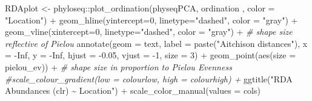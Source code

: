 \documentclass[
]{book}
\newenvironment{Shaded}{\begin{snugshade}}{\end{snugshade}}
\newcommand{\AttributeTok}[1]{\textcolor[rgb]{0.77,0.63,0.00}{#1}}
\newcommand{\CommentTok}[1]{\textcolor[rgb]{0.56,0.35,0.01}{\textit{#1}}}
\newcommand{\ConstantTok}[1]{\textcolor[rgb]{0.00,0.00,0.00}{#1}}
\newcommand{\DecValTok}[1]{\textcolor[rgb]{0.00,0.00,0.81}{#1}}
\newcommand{\FloatTok}[1]{\textcolor[rgb]{0.00,0.00,0.81}{#1}}
\newcommand{\FunctionTok}[1]{\textcolor[rgb]{0.00,0.00,0.00}{#1}}
\newcommand{\NormalTok}[1]{#1}
\newcommand{\OtherTok}[1]{\textcolor[rgb]{0.56,0.35,0.01}{#1}}
\newcommand{\SpecialCharTok}[1]{\textcolor[rgb]{0.00,0.00,0.00}{#1}}
\newcommand{\StringTok}[1]{\textcolor[rgb]{0.31,0.60,0.02}{#1}}
\begin{document}
\begin{Shaded}
\begin{Highlighting}[]
\NormalTok{RDAplot }\OtherTok{\textless{}{-}}\NormalTok{ phyloseq}\SpecialCharTok{::}\FunctionTok{plot\_ordination}\NormalTok{(physeqPCA, ordination , }
                                \AttributeTok{color =} \StringTok{"Location"}\NormalTok{)  }\SpecialCharTok{+}
  \FunctionTok{geom\_hline}\NormalTok{(}\AttributeTok{yintercept=}\DecValTok{0}\NormalTok{, }\AttributeTok{linetype=}\StringTok{"dashed"}\NormalTok{, }\AttributeTok{color =} \StringTok{"gray"}\NormalTok{) }\SpecialCharTok{+}
  \FunctionTok{geom\_vline}\NormalTok{(}\AttributeTok{xintercept=}\DecValTok{0}\NormalTok{, }\AttributeTok{linetype=}\StringTok{"dashed"}\NormalTok{, }\AttributeTok{color =} \StringTok{"gray"}\NormalTok{) }\SpecialCharTok{+}    \CommentTok{\# shape size reflective of Pielou  }
     \FunctionTok{annotate}\NormalTok{(}\AttributeTok{geom =} \StringTok{\textquotesingle{}text\textquotesingle{}}\NormalTok{, }\AttributeTok{label =} \FunctionTok{paste}\NormalTok{(}\StringTok{"Aitchison distances"}\NormalTok{), }
             \AttributeTok{x =} \SpecialCharTok{{-}}\ConstantTok{Inf}\NormalTok{, }\AttributeTok{y =} \SpecialCharTok{{-}}\ConstantTok{Inf}\NormalTok{, }\AttributeTok{hjust =} \SpecialCharTok{{-}}\FloatTok{0.05}\NormalTok{, }\AttributeTok{vjust =} \SpecialCharTok{{-}}\DecValTok{1}\NormalTok{, }\AttributeTok{size =} \DecValTok{3}\NormalTok{) }\SpecialCharTok{+}
  \FunctionTok{geom\_point}\NormalTok{(}\FunctionTok{aes}\NormalTok{(}\AttributeTok{size =}\NormalTok{ pielou\_ev)) }\SpecialCharTok{+}        \CommentTok{\# shape size in proportion to Pielou Evenness}
  \CommentTok{\#scale\_colour\_gradient(low = colourlow, high = colourhigh) +}
  \FunctionTok{ggtitle}\NormalTok{(}\StringTok{"RDA Abundances (clr) \textasciitilde{} Location"}\NormalTok{) }\SpecialCharTok{+}
  \FunctionTok{scale\_color\_manual}\NormalTok{(}\AttributeTok{values =}\NormalTok{ cols)}



\end{Highlighting}
\end{Shaded}
\end{document}
